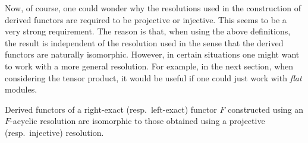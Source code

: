	Now, of course, one could wonder why the resolutions used in the construction of derived functors are required to be projective or injective. This seems to be a very strong requirement. The reason is that, when using the above definitions, the result is independent of the resolution used in the sense that the derived functors are naturally isomorphic. However, in certain situations one might want to work with a more general resolution. For example, in the next section, when considering the tensor product, it would be useful if one could just work with \textit{flat} modules.
    \begin{property}\label{homalg:acyclic_derived_functors}
        Derived functors of a right-exact (resp.~left-exact) functor $F$ constructed using an $F$-acyclic resolution are isomorphic to those obtained using a projective (resp.~injective) resolution.
    \end{property}

